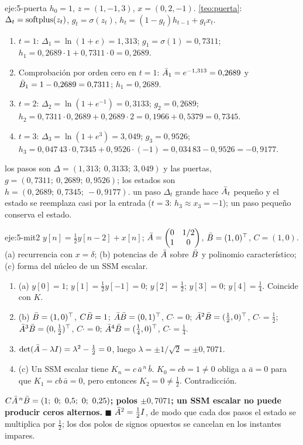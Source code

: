 \begin{solucion}{eje:5-puerta}
\datos $h_0=1$, $z=(1,-1,3)$, $x=(0,2,-1)$.
\planteamiento \cref{teo:puerta}: $\Delta_t=\operatorname{softplus}(z_t)$, $g_t=\sigma(z_t)$, $h_t=(1-g_t)h_{t-1}+g_tx_t$.
\pasos
\begin{enumerate}[label=\arabic*.]
  \item $t=1$: $\Delta_1=\ln(1+e)=1{,}313$; $g_1=\sigma(1)=0{,}7311$; $h_1=0{,}2689\cdot 1+0{,}7311\cdot 0=0{,}2689$.
  \item Comprobación por orden cero en $t=1$: $\bar{A}_1=e^{-1{,}313}=0{,}2689$ y $\bar{B}_1=1-0{,}2689=0{,}7311$; $h_1=0{,}2689$.
  \item $t=2$: $\Delta_2=\ln(1+e^{-1})=0{,}3133$; $g_2=0{,}2689$; $h_2=0{,}7311\cdot 0{,}2689+0{,}2689\cdot 2=0{,}1966+0{,}5379=0{,}7345$.
  \item $t=3$: $\Delta_3=\ln(1+e^{3})=3{,}049$; $g_3=0{,}9526$; $h_3=0{,}047\,43\cdot 0{,}7345+0{,}9526\cdot(-1)=0{,}034\,83-0{,}9526=-0{,}9177$.
\end{enumerate}
\resultado los pasos son $\Delta=(1{,}313;\ 0{,}3133;\ 3{,}049)$ y las puertas, $g=(0{,}7311;\ 0{,}2689;\ 0{,}9526)$; los estados son \textbf{$h=(0{,}2689;\ 0{,}7345;\ -0{,}9177)$}.
\comprobacion un paso $\Delta_t$ grande hace $\bar{A}_t$ pequeño y el estado se reemplaza casi por la entrada ($t=3$: $h_3\approx x_3=-1$); un paso pequeño conserva el estado.
\end{solucion}

\begin{solucion}{eje:5-mit2}
\datos $y[n]=\frac12y[n-2]+x[n]$; $\bar{A}=\begin{pmatrix}0&1/2\\1&0\end{pmatrix}$, $\bar{B}=(1,0)^{\top}$, $C=(1,0)$.
\planteamiento (a) recurrencia con $x=\delta$; (b) potencias de $\bar{A}$ sobre $\bar{B}$ y polinomio característico; (c) forma del núcleo de un SSM escalar.
\pasos
\begin{enumerate}[label=\arabic*.]
  \item (a) $y[0]=1$; $y[1]=\frac12y[-1]=0$; $y[2]=\frac12$; $y[3]=0$; $y[4]=\frac14$. Coincide con $K$.
  \item (b) $\bar{B}=(1,0)^{\top}$, $C\bar{B}=1$; $\bar{A}\bar{B}=(0,1)^{\top}$, $C\cdot=0$; $\bar{A}^{2}\bar{B}=(\frac12,0)^{\top}$, $C\cdot=\frac12$; $\bar{A}^{3}\bar{B}=(0,\frac12)^{\top}$, $C\cdot=0$; $\bar{A}^{4}\bar{B}=(\frac14,0)^{\top}$, $C\cdot=\frac14$.
  \item $\det(\bar{A}-\lambda I)=\lambda^{2}-\frac12=0$, luego $\lambda=\pm 1/\sqrt2=\pm 0{,}7071$.
  \item (c) Un SSM escalar tiene $K_n=c\,\bar a^{\,n}\,\bar b$. $K_0=cb=1\ne 0$ obliga a $\bar a=0$ para que $K_1=cb\,\bar a=0$, pero entonces $K_2=0\ne\frac12$. Contradicción.
\end{enumerate}
\resultado \textbf{$C\Abar^{\,n}\Bbar=(1;\ 0;\ 0{,}5;\ 0;\ 0{,}25)$; polos $\pm 0{,}7071$; un SSM escalar no puede producir ceros alternos.} $\blacksquare$
\comprobacion $\bar{A}^{2}=\frac12I$, de modo que cada dos pasos el estado se multiplica por $\frac12$; los dos polos de signos opuestos se cancelan en los instantes impares.
\end{solucion}

